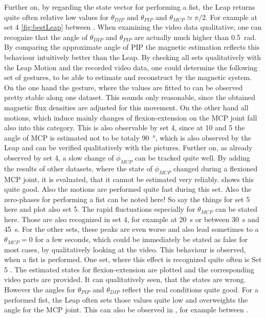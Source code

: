 Further on, by regarding the state vector for performing a fist, the Leap returns quite often relative low values for $ \theta_{DIP} $ and $ \theta_{PIP} $ and $ \theta_{MCP} \simeq \pi/2 $. For example at set 4 \ref{fig:bestLeap} between . When examining the video data qualitative, one can recognize that the angle of $ \theta_{DIP} $ and $ \theta_{PIP} $ are actually much higher than \SI{0.5}{\radian}. By comparing the approximate angle of \ac{PIP} the magnetic estimation reflects this behaviour intuitively better than the Leap. 
By checking all sets qualitatively with the Leap Motion and the recorded video data, one could determine the following set of gestures, to be able to estimate and reconstruct by the magnetic system. On the one hand the gesture, where the values are fitted to can be observed pretty stable along one dataset. This sounds only reasonable, since the obtained magnetic flux densities are adjusted for this movement. On the other hand all motions, which induce mainly changes of flexion-extension on the \ac{MCP} joint fall also into this category. This is also observable by set 4, since at 10 and 5  the angle of \ac{MCP} is estimated not to be totaly \SI{90}{\degree}, which is also observed by the Leap and can be verified qualitatively with the pictures. Further on, as already observed by set 4, a slow change of $ \phi_{MCP} $ can be tracked quite well. 
By adding the results of other datasets, where the state of $ \phi_{MCP} $ changed during a flexioned \ac{MCP} joint, it is evaluated, that it cannot be estimated very reliably.  shows this quite good. Also the motions are performed quite fast during this set. Also the zero-phases for performing a fist can be noted here! So say the things for set 5 here and plot also set 5. 
The rapid fluctuations especially for $ \theta_{MCP} $ can be stated here. Those are also recognized in set 4, for example at \SI{20}{\second} or between \SI{30}{\second} and \SI{45}{\second}. For the other sets, these peaks are even worse and also lead sometimes to a $ \theta_{MCP} = 0 $ for a few seconds, which could be immediately be stated as false for most cases, by qualitatively looking at the video. This behaviour is observed, when a fist is performed. One set, where this effect is recognized quite often is Set 5 . The estimated states for flexion-extension are plotted and the corresponding video parts are provided. It can qualitatively seen, that the states are wrong. However the angles for $ \theta_{PIP} $ and $ \theta_{DIP} $ reflect the real conditions quite good. For a performed fist, the Leap often sets those values quite low and overweights the angle for the \ac{MCP} joint. This can also be observed in , for example between . 
